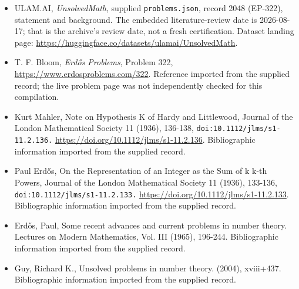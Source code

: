 \documentclass[11pt,a4paper]{article}
\begin{document}
{\small

\begin{itemize}

\item[\hypertarget{source:2048:1}{S1}] ULAM.AI, \emph{UnsolvedMath}, supplied \texttt{problems.json}, record 2048 (EP-322), statement and background. The embedded literature-review date is 2026-08-17; that is the archive’s review date, not a fresh certification. Dataset landing page: \url{https://huggingface.co/datasets/ulamai/UnsolvedMath}.

\item[\hypertarget{source:2048:2}{S2}] T. F. Bloom, \emph{Erdős Problems}, Problem 322, \url{https://www.erdosproblems.com/322}. Reference imported from the supplied record; the live problem page was not independently checked for this compilation.

\item[\hypertarget{source:2048:3}{S3}] Kurt Mahler, Note on Hypothesis K of Hardy and Littlewood, Journal of the London Mathematical Society 11 (1936), 136-138, \nolinkurl{doi:10.1112/jlms/s1-11.2.136.} \url{https://doi.org/10.1112/jlms/s1-11.2.136}. Bibliographic information imported from the supplied record.

\item[\hypertarget{source:2048:4}{S4}] Paul Erdős, On the Representation of an Integer as the Sum of k k-th Powers, Journal of the London Mathematical Society 11 (1936), 133-136, \nolinkurl{doi:10.1112/jlms/s1-11.2.133.} \url{https://doi.org/10.1112/jlms/s1-11.2.133}. Bibliographic information imported from the supplied record.

\item[\hypertarget{source:2048:5}{S5}] Erd\H{o}s, Paul, Some recent advances and current problems in number theory. Lectures on Modern Mathematics, Vol. III (1965), 196-244. Bibliographic information imported from the supplied record.

\item[\hypertarget{source:2048:6}{S6}] Guy, Richard K., Unsolved problems in number theory. (2004), xviii+437. Bibliographic information imported from the supplied record.

\end{itemize}

}

\label{end:2048}
\end{document}
